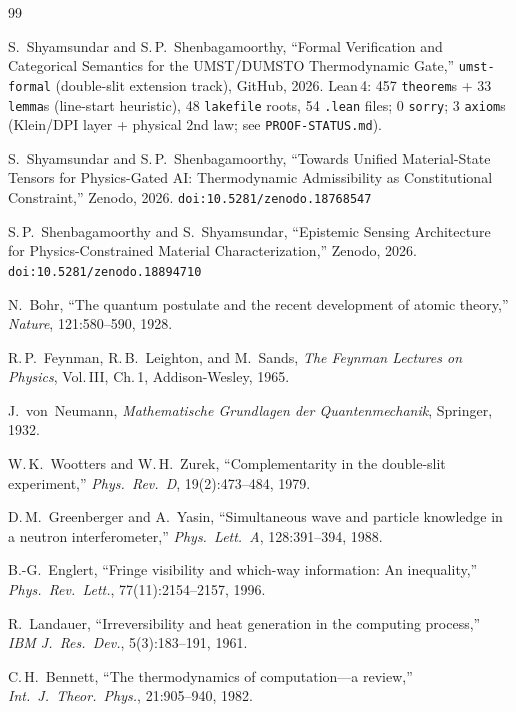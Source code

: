 \documentclass[10pt, a4paper]{article}
\begin{document}
\begingroup
\small
\begin{thebibliography}{99}

 S.~Shyamsundar and S.\,P.~Shenbagamoorthy, ``Formal Verification and Categorical Semantics for the UMST/DUMSTO Thermodynamic Gate,'' \texttt{umst-formal} (double-slit extension track), GitHub, 2026. Lean\,4: 457 \texttt{theorem}s + 33 \texttt{lemma}s (line-start heuristic), 48 \texttt{lakefile} roots, 54 \texttt{.lean} files; 0 \texttt{sorry}; 3 \texttt{axiom}s (Klein/DPI layer + physical 2nd law; see \texttt{PROOF-STATUS.md}).

 S.~Shyamsundar and S.\,P.~Shenbagamoorthy, ``Towards Unified Material-State Tensors for Physics-Gated AI: Thermodynamic Admissibility as Constitutional Constraint,'' Zenodo, 2026. \texttt{doi:10.5281/zenodo.18768547}

 S.\,P.~Shenbagamoorthy and S.~Shyamsundar, ``Epistemic Sensing Architecture for Physics-Constrained Material Characterization,'' Zenodo, 2026. \texttt{doi:10.5281/zenodo.18894710}

 N.~Bohr, ``The quantum postulate and the recent development of atomic theory,'' \textit{Nature}, 121:580--590, 1928.

 R.\,P.~Feynman, R.\,B.~Leighton, and M.~Sands, \textit{The Feynman Lectures on Physics}, Vol.\,III, Ch.\,1, Addison-Wesley, 1965.

 J.~von~Neumann, \textit{Mathematische Grundlagen der Quantenmechanik}, Springer, 1932.

 W.\,K.~Wootters and W.\,H.~Zurek, ``Complementarity in the double-slit experiment,'' \textit{Phys.\ Rev.\ D}, 19(2):473--484, 1979.

 D.\,M.~Greenberger and A.~Yasin, ``Simultaneous wave and particle knowledge in a neutron interferometer,'' \textit{Phys.\ Lett.\ A}, 128:391--394, 1988.

 B.-G.~Englert, ``Fringe visibility and which-way information: An inequality,'' \textit{Phys.\ Rev.\ Lett.}, 77(11):2154--2157, 1996.

 R.~Landauer, ``Irreversibility and heat generation in the computing process,'' \textit{IBM J.\ Res.\ Dev.}, 5(3):183--191, 1961.

 C.\,H.~Bennett, ``The thermodynamics of computation---a review,'' \textit{Int.\ J.\ Theor.\ Phys.}, 21:905--940, 1982.


\end{thebibliography}
\end{document}
